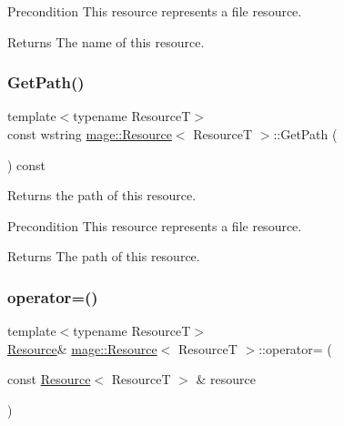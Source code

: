 \begin{DoxyPrecond}{Precondition}
This resource represents a file resource. 
\end{DoxyPrecond}
\begin{DoxyReturn}{Returns}
The name of this resource. 
\end{DoxyReturn}
\hypertarget{classmage_1_1_resource_a01cb4f6f8ff66a1f2545edc89af656c9}{}\label{classmage_1_1_resource_a01cb4f6f8ff66a1f2545edc89af656c9} 
\subsubsection{\texorpdfstring{Get\+Path()}{GetPath()}}
{\footnotesize\ttfamily template$<$typename ResourceT$>$ \\
const wstring \hyperlink{classmage_1_1_resource}{mage\+::\+Resource}$<$ ResourceT $>$\+::Get\+Path (\begin{DoxyParamCaption}{ }\end{DoxyParamCaption}) const}

Returns the path of this resource.

\begin{DoxyPrecond}{Precondition}
This resource represents a file resource. 
\end{DoxyPrecond}
\begin{DoxyReturn}{Returns}
The path of this resource. 
\end{DoxyReturn}
\hypertarget{classmage_1_1_resource_a938159cb02ec565b9b957f993db4769d}{}\label{classmage_1_1_resource_a938159cb02ec565b9b957f993db4769d} 
\subsubsection{\texorpdfstring{operator=()}{operator=()}\hspace{0.1cm}{\footnotesize\ttfamily [1/2]}}
{\footnotesize\ttfamily template$<$typename ResourceT$>$ \\
\hyperlink{classmage_1_1_resource}{Resource}\& \hyperlink{classmage_1_1_resource}{mage\+::\+Resource}$<$ ResourceT $>$\+::operator= (\begin{DoxyParamCaption}\item[{const \hyperlink{classmage_1_1_resource}{Resource}$<$ ResourceT $>$ \&}]{resource }\end{DoxyParamCaption})\hspace{0.3cm}{\ttfamily [delete]}}

